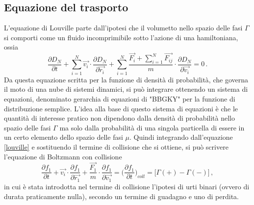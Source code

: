 \subsection{Equazione del trasporto}
L'equazione di Louville parte dall'ipotesi che il volumetto nello spazio delle 
fasi $\Gamma$ si comporti come un fluido incomprimibile sotto l'azione di una 
hamiltoniana, ossia
\begin{equation}
\label{louville}
\frac{\partial D_N}{\partial t} + \sum_{i=1}^N \vec{v_i} \cdot \frac{\partial 
D_N}{\partial \vec{r_i}} + \sum_{i=1}^N \frac{\vec{F_i}+\sum_{i=1}^N 
\vec{F_{ij}}}{m} \cdot \frac{\partial D_N}{\partial \vec{v_i}} = 0 \,.
\end{equation} 
Da questa equazione scritta per la funzione di densità di probabilità, che 
governa il moto di una nube di sistemi dinamici, si può integrare ottenendo 
un sistema di equazioni, denominato gerarchia di equazioni di "BBGKY" per la 
funzione di distribuzione semplice. L'idea alla base di questo sistema di 
equazioni è che le quantità di interesse pratico non dipendono dalla densità di 
probabilità nello spazio delle fasi $\Gamma$ ma solo dalla probabilità di una 
singola particella di essere in un certo elemento dello spazio delle fasi $\mu$.
Quindi integrando dall'equazione \eqref{louville} e sostituendo il termine di 
collisione che si ottiene, si può scrivere l'equazione di Boltzmann con 
collisione
\begin{equation}
\label{boltzmann}
\frac{\partial f_1}{\partial t} + \vec{v_i} \cdot \frac{\partial f_1}{\partial 
\vec{r_1}} + \frac{\vec{F_1}}{m} \cdot \frac{\partial f_1}{\partial \vec{v_1}} = 
\biggl(\frac{\partial f_1}{\partial t}\biggr)_{coll} = \bigl[\Gamma (+)-\Gamma 
(-)\bigr] \,,
\end{equation}
in cui è stata introdotta nel termine di collisione l'ipotesi di urti binari 
(ovvero di durata praticamente nulla), secondo un termine di guadagno e uno di 
perdita.

